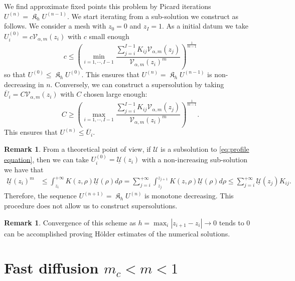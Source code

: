 \documentclass[a4paper]{article}
\theoremstyle{definition}
\newtheorem{remark}[theorem]{Remark}
\DeclareMathOperator{\fixedpoint}{\mathfrak K}
\begin{document}
We find approximate fixed points this problem by Picard iterations $U^{(n)} = \fixedpoint_h U^{(n-1)}$. We start iterating from a sub-solution we construct as follows.
We consider a mesh with $z_0 = 0$ and $z_I = 1$. As a initial datum we take $U^{(0)}_i = c \mathcal V_{\alpha,m}(z_i)$ with $c$ small enough
\begin{equation*}
c \le \left( \min_{i=1,\cdots,I-1} \frac{\sum_{j=i}^{I-1}  K_{ij} \mathcal V_{\alpha,m}(z_j) }{\mathcal V_{\alpha,m}(z_i)^m}\right)^{\frac 1 {m-1}}
\end{equation*}
so that $U^{(0)} \le \fixedpoint_h U^{(0)}$. This ensures that $U^{(n)} = \fixedpoint_h U^{(n-1)}$ is non-decreasing in $n$. Conversely, we can construct a supersolution by taking $\overline U_i = C \mathcal V_{\alpha,m}(z_i)$ with $C$ chosen large enough:
\begin{equation*}
C \ge \left( \max_{i=1,\cdots,I-1} \frac{\sum_{j=i}^{I-1}  K_{ij} \mathcal V_{\alpha,m}(z_j) }{\mathcal V_{\alpha,m}(z_i)^m}\right)^{\frac 1 {m-1}}.
\end{equation*}
This ensures that $U^{(n)} \le \overline U_i$.

\begin{remark}
From a theoretical point of view, if $\mathcal U$ is a subsolution to \eqref{eq:profile equation}, then we can take $U_i^{(0)} = \underline{\mathcal U}(z_i)$ with a non-increasing sub-solution we have that
\begin{align*}
  \underline{\mathcal U}(z_i)^m & \le  \int_{z_i}^{+\infty} K(z,\rho) \underline{\mathcal U}(\rho) d \rho   =  \sum_{j=i}^{+\infty}  \int_{z_j}^{z_{j+1}} K(z,\rho) \underline{\mathcal U}(\rho) d \rho
  \le \sum_{j=i}^{+\infty} \underline{\mathcal U}(z_j) K_{ij} .
\end{align*}
Therefore, the sequence $U^{(n+1)} = \fixedpoint_h U^{(n)}$ is monotone decreasing. This procedure does not allow us to construct supersolutions.
\end{remark}

\normalcolor

\begin{remark}
Convergence of this scheme as $h = \max_i |z_{i+1} - z_{i}| \to 0$ tends to $0$ can be accomplished proving Hölder estimates of the numerical solutions.
\end{remark}

%

%
%
%
%
%
%
%
%
%
%
%
%
%
%
%
%
%
%

\normalcolor

%
\section{Fast diffusion $m_c < m < 1$}
\end{document}
